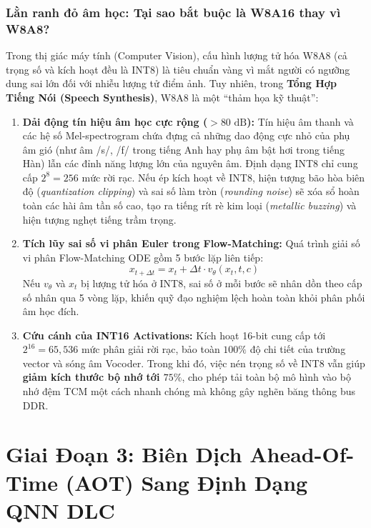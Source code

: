 \documentclass[11pt,a4paper,oneside,table]{report}
\begin{document}
\subsubsection{Lằn ranh đỏ âm học: Tại sao bắt buộc là W8A16 thay vì W8A8?}
Trong thị giác máy tính (Computer Vision), cấu hình lượng tử hóa W8A8 (cả trọng số và kích hoạt đều là INT8) là tiêu chuẩn vàng vì mắt người có ngưỡng dung sai lớn đối với nhiễu lượng tử điểm ảnh. Tuy nhiên, trong \textbf{Tổng Hợp Tiếng Nói (Speech Synthesis)}, W8A8 là một ``thảm họa kỹ thuật'':
\begin{enumerate}
    \item \textbf{Dải động tín hiệu âm học cực rộng ($> 80\text{ dB}$):} Tín hiệu âm thanh và các hệ số Mel-spectrogram chứa đựng cả những dao động cực nhỏ của phụ âm gió (như âm /s/, /f/ trong tiếng Anh hay phụ âm bật hơi trong tiếng Hàn) lẫn các đỉnh năng lượng lớn của nguyên âm. Định dạng INT8 chỉ cung cấp $2^8 = 256$ mức rời rạc. Nếu ép kích hoạt về INT8, hiện tượng bão hòa biên độ (\textit{quantization clipping}) và sai số làm tròn (\textit{rounding noise}) sẽ xóa sổ hoàn toàn các hài âm tần số cao, tạo ra tiếng rít rè kim loại (\textit{metallic buzzing}) và hiện tượng nghẹt tiếng trầm trọng.
    \item \textbf{Tích lũy sai số vi phân Euler trong Flow-Matching:} Quá trình giải số vi phân Flow-Matching ODE gồm 5 bước lặp liên tiếp:
    \begin{equation}
        x_{t + \Delta t} = x_t + \Delta t \cdot v_\theta(x_t, t, c)
    \end{equation}
    Nếu $v_\theta$ và $x_t$ bị lượng tử hóa ở INT8, sai số ở mỗi bước sẽ nhân dồn theo cấp số nhân qua 5 vòng lặp, khiến quỹ đạo nghiệm lệch hoàn toàn khỏi phân phối âm học đích.
    \item \textbf{Cứu cánh của INT16 Activations:} Kích hoạt 16-bit cung cấp tới $2^{16} = 65,536$ mức phân giải rời rạc, bảo toàn $100\%$ độ chi tiết của trường vector và sóng âm Vocoder. Trong khi đó, việc nén trọng số về INT8 vẫn giúp \textbf{giảm kích thước bộ nhớ tới $75\%$}, cho phép tải toàn bộ mô hình vào bộ nhớ đệm TCM một cách nhanh chóng mà không gây nghẽn băng thông bus DDR.
\end{enumerate}

\section{Giai Đoạn 3: Biên Dịch Ahead-Of-Time (AOT) Sang Định Dạng QNN DLC}
\label{sec:stage3_compilation}
\end{document}
